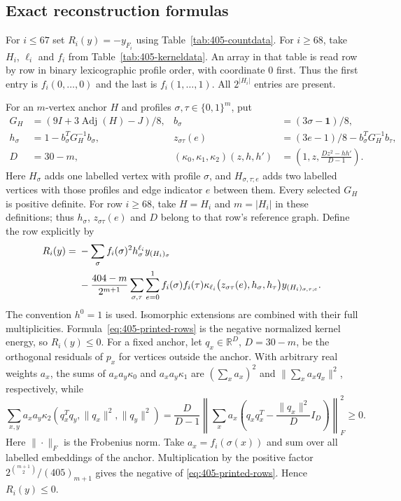 \documentclass[11pt]{article}
\theoremstyle{remark}
\numberwithin{equation}{section}
\begin{document}
\subsection*{Exact reconstruction formulas}
For $i\le67$ set $R_i(y)=-y_{F_i}$ using Table~\ref{tab:405-countdata}.
For $i\ge68$, take $H_i$, $\ell_i$ and $f_i$ from
Table~\ref{tab:405-kerneldata}. An array in that table is read row by
row in binary lexicographic profile order, with coordinate $0$ first.
Thus the first entry is $f_i(0,\ldots,0)$ and the last is
$f_i(1,\ldots,1)$. All $2^{|H_i|}$ entries are present.

For an $m$-vertex anchor $H$ and profiles $\sigma,\tau\in\{0,1\}^m$, put
\begin{align*}
 G_H&=(9I+3\operatorname{Adj}(H)-J)/8,
 &b_\sigma&=(3\sigma-\mathbf1)/8,\\
 h_\sigma&=1-b_\sigma^TG_H^{-1}b_\sigma,
 &z_{\sigma\tau}(e)&=(3e-1)/8-b_\sigma^TG_H^{-1}b_\tau,\\
 D&=30-m,
 &(\kappa_0,\kappa_1,\kappa_2)(z,h,h')
   &=\left(1,z,\frac{Dz^2-hh'}{D-1}\right).
\end{align*}
Here $H_\sigma$ adds one labelled vertex with profile $\sigma$,
and $H_{\sigma,\tau;e}$ adds two labelled vertices with those profiles
and edge indicator $e$ between them. Every selected $G_H$ is positive
definite. For row $i\ge68$, take $H=H_i$ and $m=|H_i|$ in these
definitions; thus $h_\sigma$, $z_{\sigma\tau}(e)$ and $D$ belong to
that row's reference graph. Define the row explicitly by
\begin{align}
 R_i(y)={}&-\sum_\sigma f_i(\sigma)^2h_\sigma^{\ell_i}y_{(H_i)_\sigma}
 \notag\\
 &-\frac{404-m}{2^{m+1}}
 \sum_{\sigma,\tau}\sum_{e=0}^1
 f_i(\sigma)f_i(\tau)
 \kappa_{\ell_i}\bigl(z_{\sigma\tau}(e),h_\sigma,h_\tau\bigr)
 y_{(H_i)_{\sigma,\tau;e}}.
 \label{eq:405-printed-rows}
\end{align}
The convention $h^0=1$ is used. Isomorphic extensions are combined
with their full multiplicities. Formula~\eqref{eq:405-printed-rows}
is the negative normalized kernel energy, so $R_i(y)\le0$.
For a fixed anchor, let $q_x\in\mathbb R^D$, $D=30-m$, be the
orthogonal residuals of $p_x$ for vertices outside the anchor.
With arbitrary real weights $a_x$,
the sums of $a_xa_y\kappa_0$ and $a_xa_y\kappa_1$ are
$(\sum_xa_x)^2$ and $\|\sum_xa_xq_x\|^2$, respectively, while
\[
 \sum_{x,y}a_xa_y\kappa_2(q_x^Tq_y,\|q_x\|^2,\|q_y\|^2)
 =\frac{D}{D-1}\left\|\sum_xa_x
 \left(q_xq_x^T-\frac{\|q_x\|^2}{D}I_D\right)\right\|_F^2\ge0.
\]
Here $\|\cdot\|_F$ is the Frobenius norm.
Take $a_x=f_i(\sigma(x))$ and sum over all labelled embeddings of
the anchor. Multiplication by the positive factor
$2^{\binom{m+1}{2}}/(405)_{m+1}$ gives the negative of
\eqref{eq:405-printed-rows}. Hence $R_i(y)\le0$.
\end{document}

